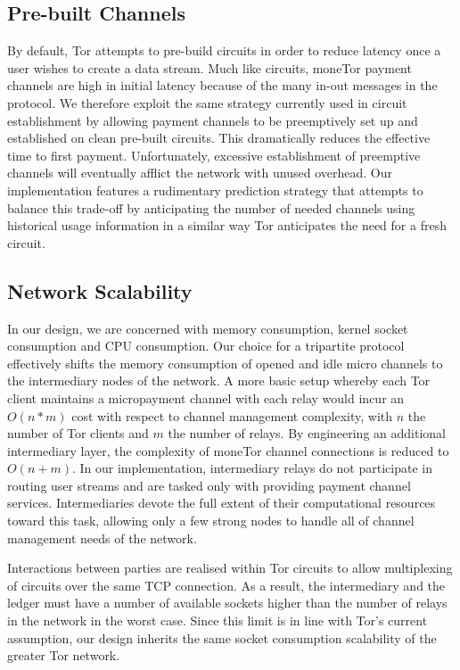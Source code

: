 \subsection{Pre-built Channels}
By default, Tor attempts to pre-build circuits in order to reduce latency once a
user wishes to create a data stream. Much like circuits, moneTor payment
channels are high in initial latency because of the many in-out messages in the protocol. We therefore exploit the same strategy currently used in circuit establishment by
allowing payment channels to be preemptively set up and established on clean
pre-built circuits. This dramatically reduces the effective time to first
payment. Unfortunately, excessive establishment of preemptive channels will
eventually afflict the network with unused overhead. Our implementation features
a rudimentary prediction strategy that attempts to balance this trade-off by
anticipating the number of needed channels using historical usage
information in a similar way Tor anticipates the need for a fresh circuit.

\subsection{Network Scalability}
\label{subsub:scalability}

In our design, we are concerned with memory consumption, kernel socket
consumption and CPU consumption. Our choice for a tripartite protocol
effectively shifts the memory consumption of opened and idle micro
channels to the intermediary nodes of the network. A more basic setup
whereby each Tor client maintains a micropayment channel with each
relay would incur an $O(n*m)$ cost with
respect to channel management complexity, with $n$ the number of Tor clients and $m$ the number of relays. By engineering an additional
intermediary layer, the complexity of moneTor channel connections is
reduced to $O(n+m)$. In our implementation, intermediary relays do not
participate in routing user streams and are tasked only with providing
payment channel services. Intermediaries devote the full extent of
their computational resources toward this task, allowing only a few
strong nodes to handle all of channel management needs of the network.

Interactions between parties are realised within Tor circuits to allow
multiplexing of circuits over the same TCP connection. As a result, the
intermediary and the ledger must have a number of available sockets higher than
the number of relays in the network in the worst case. Since this limit is in
line with Tor's current assumption, our design inherits the same socket
consumption scalability of the greater Tor network.



